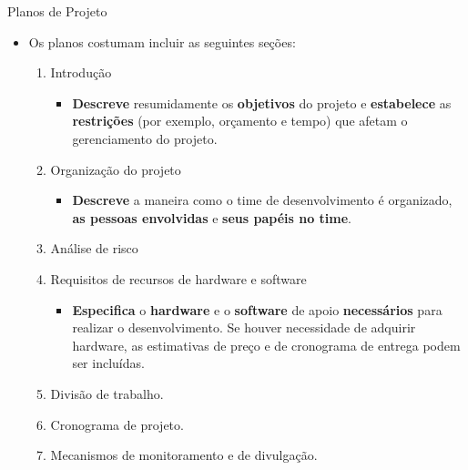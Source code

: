 \documentclass{beamer}
\begin{document}
\begin{frame}{Planos de Projeto}
    \begin{itemize}
        \justifying
        \item Os planos costumam incluir as seguintes seções:
            \begin{enumerate}
                \item \alert<2>{Introdução}
                    \begin{itemize}
                        \justifying
                        \item<2> \textbf{Descreve} resumidamente os \textbf{objetivos} do projeto e \textbf{estabelece} as \textbf{restrições} (por exemplo, orçamento e tempo) que afetam o gerenciamento do projeto.
                    \end{itemize}
                \item \alert<3>{Organização do projeto}
                    \begin{itemize}
                        \justifying
                        \item<3> \textbf{Descreve} a maneira como o time de desenvolvimento é organizado, \textbf{as pessoas envolvidas} e \textbf{seus papéis no time}.
                    \end{itemize}
                \item Análise de risco
                \item \alert<4>{Requisitos de recursos de hardware e software}
                    \begin{itemize}
                        \justifying
                        \item<4> \textbf{Especifica} o \textbf{hardware} e o \textbf{software} de apoio \textbf{necessários} para realizar o desenvolvimento. Se houver necessidade de adquirir hardware, as estimativas de preço e de cronograma de entrega podem ser incluídas.
                    \end{itemize}
                \item Divisão de trabalho.
                \item Cronograma de projeto.
                \item Mecanismos de monitoramento e de divulgação.
            \end{enumerate}
    \end{itemize}
\end{frame}
\end{document}
